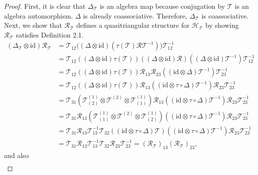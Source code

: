 \documentclass[10pt,a4paper]{amsart}
\begin{document}
\begin{proof}
    First, it is clear that $\Delta_\mathcal{T}$ is an algebra map because conjugation by $\mathcal{T}$ is an algebra automorphism. $\Delta$ is already coassociative. Therefore, $\Delta_\mathcal{T}$ is coassociative. Next, we show that $\mathcal{R}_\mathcal{T}$ defines a quasitriangular structure for $\mathscr{H}_\mathcal{T}$ by showing $\mathcal{R}_\mathcal{T}$ satisfies Definition 2.1. 
    \begin{equation}
        \begin{split}
            (\Delta_{\mathcal{T}}\otimes \textrm{id})\mathcal{R}_{\mathcal{T}}
&= \mathcal{T}_{12}\bigl((\Delta\otimes \textrm{id})(\tau(\mathcal{T})\mathcal{R}\mathcal{T}^{-1})\bigr)\mathcal{T}_{12}^{-1} \\
&= \mathcal{T}_{12}((\Delta\otimes \textrm{id})\tau(\mathcal{T}))((\Delta\otimes \textrm{id})\mathcal{R})((\Delta\otimes \textrm{id})\mathcal{T}^{-1})\mathcal{T}_{12}^{-1} \\
&= \mathcal{T}_{12}((\Delta\otimes \textrm{id})\tau(\mathcal{T}))\mathcal{R}_{13}\mathcal{R}_{23}((\textrm{id}\otimes \Delta)\mathcal{T}^{-1})\mathcal{T}_{23}^{-1} \\
&= \mathcal{T}_{12}((\Delta\otimes \textrm{id})\tau(\mathcal{T}))\mathcal{R}_{13}((\textrm{id}\otimes \tau\circ \Delta)\mathcal{T}^{-1})\mathcal{R}_{23}\mathcal{T}_{23}^{-1} \\
&= \mathcal{T}_{31}(\mathcal{T}^{(1)}_{(2)}\otimes \mathcal{T}^{(2)}\otimes \mathcal{T}^{(1)}_{(1)})\mathcal{R}_{13}((\textrm{id}\otimes \tau\circ \Delta)\mathcal{T}^{-1})\mathcal{R}_{23}\mathcal{T}_{23}^{-1} \\
&= \mathcal{T}_{31}\mathcal{R}_{13}(\mathcal{T}^{(1)}_{(1)}\otimes \mathcal{T}^{(2)}\otimes \mathcal{T}^{(1)}_{(2)})((\textrm{id}\otimes \tau\circ \Delta)\mathcal{T}^{-1})\mathcal{R}_{23}\mathcal{T}_{23}^{-1} \\
&= \mathcal{T}_{31}\mathcal{R}_{13}\mathcal{T}_{13}^{-1}\mathcal{T}_{32}((\textrm{id}\otimes \tau\circ \Delta)\mathcal{T})((\textrm{id}\otimes \tau\circ \Delta)\mathcal{T}^{-1})\mathcal{R}_{23}\mathcal{T}_{23}^{-1} \\
&= \mathcal{T}_{31}\mathcal{R}_{13}\mathcal{T}_{13}^{-1}\mathcal{T}_{32}\mathcal{R}_{23}\mathcal{T}_{23}^{-1} 
= (\mathcal{R}_{\mathcal{T}})_{13}(\mathcal{R}_{\mathcal{T}})_{23},
        \end{split}
    \end{equation}
    and also
    \begin{equation}
        \begin{split}

\end{split}
\end{equation}
\end{proof}
\end{document}
